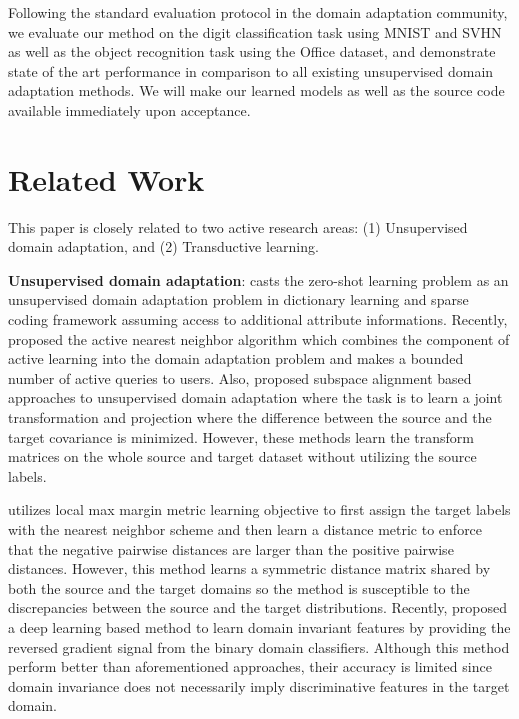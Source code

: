 \documentclass{article}
\begin{document}
Following the standard evaluation protocol in the domain adaptation community, we evaluate our method on the digit classification task using MNIST \cite{mnist} and SVHN\cite{svhn} as well as the object recognition task using the Office \cite{office} dataset, and demonstrate state of the art performance in comparison to all existing unsupervised domain adaptation methods.  We will make our learned models as well as the source code available immediately upon acceptance.

\section{Related Work} 

This paper is closely related to two active research areas: (1) Unsupervised domain adaptation, and (2) Transductive learning.

\textbf{Unsupervised domain adaptation}: \cite{iccv15} casts the zero-shot learning \cite{zsl} problem as an unsupervised domain adaptation problem in dictionary learning and sparse coding framework assuming access to additional attribute informations. Recently, \cite{activeNN} proposed the active nearest neighbor algorithm which combines the component of active learning into the domain adaptation problem and makes a bounded number of active queries to users. Also, \cite{gong12, fernando13, baochen16} proposed subspace alignment based approaches to unsupervised domain adaptation where the task is to learn a joint transformation and projection where the difference between the source and the target covariance is minimized. However, these methods learn the transform matrices on the whole source and target dataset without utilizing the source labels. 

\cite{tommasi13} utilizes local max margin metric learning objective \cite{lmnn} to first assign the target labels with the nearest neighbor scheme and then learn a distance metric to enforce that the negative pairwise distances are larger than the positive pairwise distances. However, this method learns a symmetric distance matrix shared by both the source and the target domains so the method is susceptible to the discrepancies between the source and the target distributions. Recently, \cite{ganin15, tzeng14} proposed a deep learning based method to learn domain invariant features by providing the reversed gradient signal from the binary domain classifiers. Although this method perform better than aforementioned approaches, their accuracy is limited since domain invariance does not necessarily imply discriminative features in the target domain. 
\end{document}
